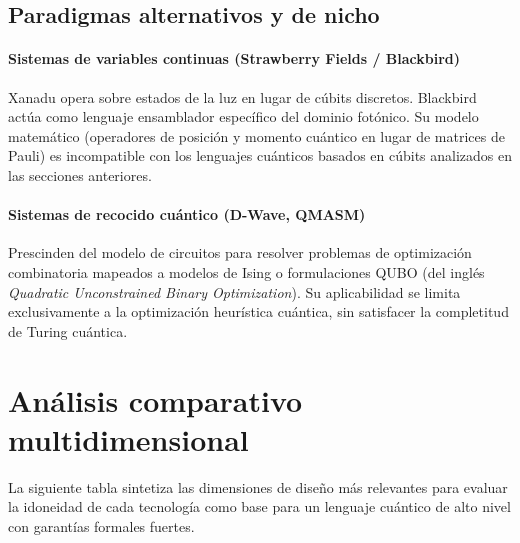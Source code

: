 \subsection{Paradigmas alternativos y de nicho}

\paragraph{Sistemas de variables continuas (Strawberry Fields / Blackbird)}
Xanadu opera sobre estados de la luz en lugar de cúbits discretos. Blackbird actúa como lenguaje ensamblador específico del dominio fotónico. Su modelo matemático (operadores de posición y momento cuántico en lugar de matrices de Pauli) es incompatible con los lenguajes cuánticos basados en cúbits analizados en las secciones anteriores.

\paragraph{Sistemas de recocido cuántico (D-Wave, QMASM)}
Prescinden del modelo de circuitos para resolver problemas de optimización combinatoria mapeados a modelos de Ising o formulaciones QUBO (del inglés \textit{Quadratic Unconstrained Binary Optimization}). Su aplicabilidad se limita exclusivamente a la optimización heurística cuántica, sin satisfacer la completitud de Turing cuántica.

\section{Análisis comparativo multidimensional}

La siguiente tabla sintetiza las dimensiones de diseño más relevantes para evaluar la idoneidad de cada tecnología como base para un lenguaje cuántico de alto nivel con garantías formales fuertes.

